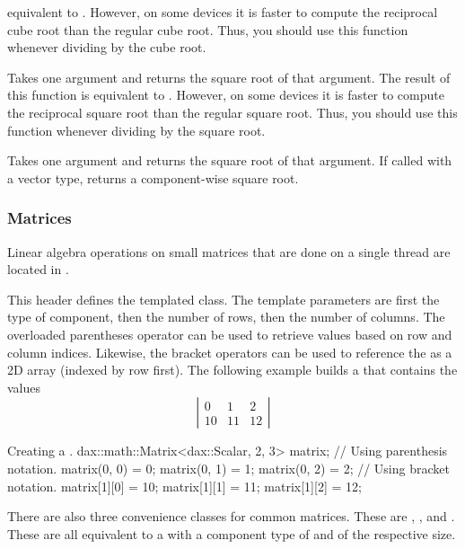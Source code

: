 \begin{description}
  equivalent to . However, on some devices it is faster
  to compute the reciprocal cube root than the regular cube root. Thus, you
  should use this function whenever dividing by the cube root.
\item[\daxmath{RSqrt}]  Takes one argument
  and returns the square root of that argument. The result of this function
  is equivalent to . However, on some devices it is
  faster to compute the reciprocal square root than the regular square
  root. Thus, you should use this function whenever dividing by the square
  root.
\item[\daxmath{Sqrt}]  Takes one argument and returns
  the square root of that argument. If called with a vector type, returns a
  component-wise square root.
\end{description}

\subsubsection{Matrices}

Linear algebra operations on small matrices that are done on a single
thread are located in .

This header defines the  templated class. The template
parameters are first the type of component, then the number of rows, then
the number of columns. The overloaded parentheses operator can be used to
retrieve values based on row and column indices. Likewise, the bracket
operators can be used to reference the  as a 2D
array (indexed by row first). The following example builds a
 that contains the values
\begin{equation*}
  \left|
  \begin{array}{ccc}
    0 & 1 & 2 \\
    10 & 11 & 12
  \end{array}
  \right|
\end{equation*}

\begin{daxexample}{Creating a .}
dax::math::Matrix<dax::Scalar, 2, 3> matrix;
// Using parenthesis notation.
matrix(0, 0) = 0;
matrix(0, 1) = 1;
matrix(0, 2) = 2;
// Using bracket notation.
matrix[1][0] = 10;
matrix[1][1] = 11;
matrix[1][2] = 12;
\end{daxexample}

There are also three convenience classes for common matrices. These are
, , and . These
are all equivalent to a  with a component type of
 and of the respective size.

